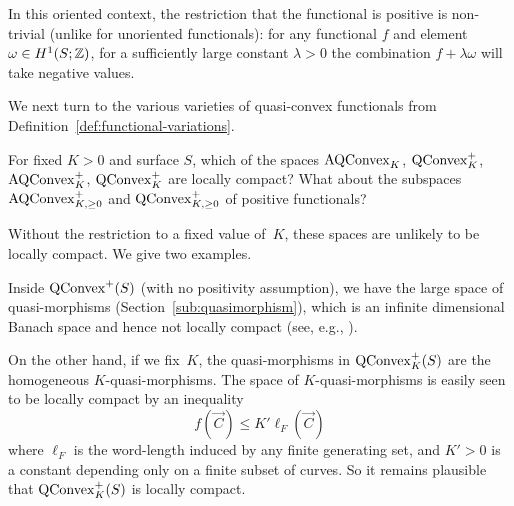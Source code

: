 In this oriented context, the restriction that the functional is
positive is non-trivial (unlike for unoriented functionals): for any
functional $f$ and element $\omega \in H^1(S; \mathbb{Z})$, for a sufficiently
large constant $\lambda>0$ the combination $f + \lambda\omega$ will take negative values.

We next turn to the various varieties of quasi-convex functionals from
Definition~\ref{def:functional-variations}.

\begin{question}
  For fixed $K > 0$ and surface $S$, which of the spaces $\mathrm{AQConvex}_K$,
  $\mathrm{QConvex}^+_K$, $\mathrm{AQConvex}^+_K$, $\mathrm{QConvex}^+_K$ are
  locally compact? What about the subspaces $\mathrm{AQConvex}^+_{K,\ge 0}$
  and $\mathrm{QConvex}^+_{K,\ge 0}$ of positive functionals?
\end{question}

Without the restriction to a fixed value of~$K$, these spaces are
unlikely to be locally compact. We give two examples.

Inside $\mathrm{QConvex}^+(S)$ (with no positivity assumption), we have the
large space of quasi-morphisms (Section~\ref{sub:quasimorphism}),
which is an infinite dimensional Banach space and hence not locally
compact (see, e.g., \cite{CRH26:Quasimorphisms}).

On the other hand, if we fix~$K$, the quasi-morphisms in
$\mathrm{QConvex}_K^+(S)$ are the homogeneous $K$-quasi-morphisms. The space
of $K$-quasi-morphisms is easily seen to be locally compact by an
inequality
\[
f(\vec C) \leq K' \ell_F(\vec C)
\]
where $\ell_F$ is the word-length induced by any finite generating
set, and $K'>0$ is a constant depending only on a finite subset of
curves. So it remains plausible that $\mathrm{QConvex}_K^+(S)$ is locally
compact.



